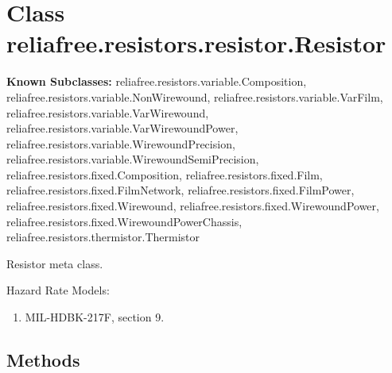 %
%
%


\section{Class reliafree.resistors.resistor.Resistor}

    \label{reliafree:resistors:resistor:Resistor}
\textbf{Known Subclasses:}
reliafree.resistors.variable.Composition,
    reliafree.resistors.variable.NonWirewound,
    reliafree.resistors.variable.VarFilm,
    reliafree.resistors.variable.VarWirewound,
    reliafree.resistors.variable.VarWirewoundPower,
    reliafree.resistors.variable.WirewoundPrecision,
    reliafree.resistors.variable.WirewoundSemiPrecision,
    reliafree.resistors.fixed.Composition,
    reliafree.resistors.fixed.Film,
    reliafree.resistors.fixed.FilmNetwork,
    reliafree.resistors.fixed.FilmPower,
    reliafree.resistors.fixed.Wirewound,
    reliafree.resistors.fixed.WirewoundPower,
    reliafree.resistors.fixed.WirewoundPowerChassis,
    reliafree.resistors.thermistor.Thermistor

Resistor meta class.

Hazard Rate Models:

\begin{enumerate}

\setlength{\parskip}{0.5ex}
  \item MIL-HDBK-217F, section 9.

\end{enumerate}



  \subsection{Methods}

